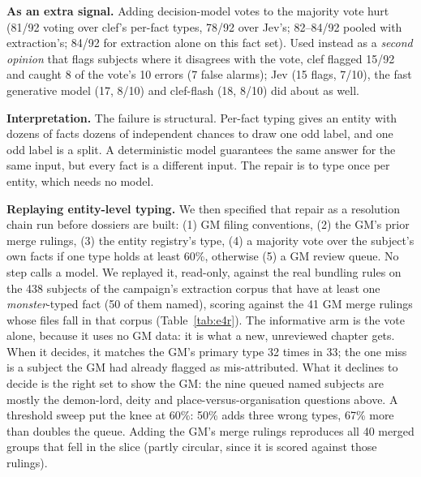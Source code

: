 \documentclass[11pt]{article}
\begin{document}
\textbf{As an extra signal.} Adding decision-model votes to the majority vote hurt (81/92 voting over
clef's per-fact types, 78/92 over Jev's; 82--84/92 pooled with extraction's; 84/92 for extraction
alone on this fact set). Used instead as a \emph{second opinion} that flags subjects where it
disagrees with the vote, clef flagged 15/92 and caught 8 of the vote's 10 errors (7 false alarms);
Jev (15 flags, 7/10), the fast generative model (17, 8/10) and clef-flash (18, 8/10) did about as
well.

\textbf{Interpretation.} The failure is structural. Per-fact typing gives an entity with dozens of
facts dozens of independent chances to draw one odd label, and one odd label is a split. A
deterministic model guarantees the same answer for the same input, but every fact is a different
input. The repair is to type once per entity, which needs no model.

\textbf{Replaying entity-level typing.} We then specified that repair as a resolution chain run
before dossiers are built: (1) GM filing conventions, (2) the GM's prior merge rulings, (3) the entity
registry's type, (4) a majority vote over the subject's own facts if one type holds at least 60\%,
otherwise (5) a GM review queue. No step calls a model. We replayed it, read-only, against the real
bundling rules on the 438 subjects of the campaign's extraction corpus that have at least one
\emph{monster}-typed fact (50 of them named), scoring against the 41 GM merge rulings whose files fall
in that corpus (Table~\ref{tab:e4r}). The informative arm is the vote alone, because it uses no GM
data: it is what a new, unreviewed chapter gets. When it decides, it matches the GM's primary type 32
times in 33; the one miss is a subject the GM had already flagged as mis-attributed. What it declines
to decide is the right set to show the GM: the nine queued named subjects are mostly the demon-lord,
deity and place-versus-organisation questions above. A threshold sweep put the knee at 60\%: 50\% adds
three wrong types, 67\% more than doubles the queue. Adding the GM's merge rulings reproduces all 40
merged groups that fell in the slice (partly circular, since it is scored against those rulings).
\end{document}
